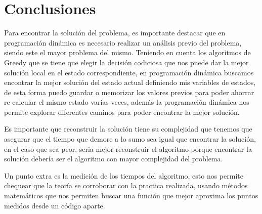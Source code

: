 \section{Conclusiones}

Para encontrar la solución del problema, es importante destacar que en programación dinámica es necesario realizar un análisis previo del problema, siendo este el mayor problema del mismo. Teniendo en cuenta los algoritmos de Greedy que se tiene que elegir la decisión codiciosa que nos puede dar la mejor solución local en el estado correspondiente, en programación dinámica buscamos encontrar la mejor solución del estado actual definiendo mis variables de estados, de esta forma puedo guardar o memorizar los valores previos para poder ahorrar re calcular el mismo estado varias veces, además la programación dinámica nos permite explorar diferentes caminos para poder encontrar la mejor solución.

Es importante que reconstruir la solución tiene su complejidad que tenemos que asegurar que el tiempo que demore a lo sumo sea igual que encontrar la solución, en el caso que sea peor, seria mejor reconstruir el algoritmo porque encontrar la solución debería ser el algoritmo con mayor complejidad del problema.

Un punto extra es la medición de los tiempos del algoritmo, esto nos permite chequear que la teoría se corroborar con la practica realizada, usando métodos matemáticos que nos permiten buscar una función que mejor aproxima los puntos medidos desde un código aparte.